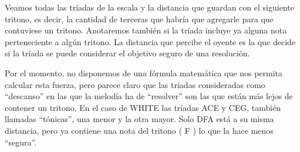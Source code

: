 \documentclass[]{report}
\begin{document}
Veamos todas las tríadas de la escala y la distancia que guardan con el siguiente tritono, es decir, la cantidad de terceras que habría que agregarle para que contuviese un tritono. Anotaremos también si la tríada incluye ya alguna nota perteneciente a algún tritono. La distancia que percibe el oyente es la que decide si la tríada se puede considerar el objetivo seguro de una resolución.

Por el momento, no disponemos de una fórmula matemática que nos permita calcular esta fuerza, pero parece claro que las tríadas consideradas como ``descanso'' en las que la melodía ha de ``resolver'' son las que están más lejos de contener un tritono. En el caso de \textsf{WHITE} las tríadas \textsf{ACE} y \textsf{CEG}, también llamadas ``tónicas'', una menor y la otra mayor. Solo \textsf{DFA} está a su misma distancia, pero ya contiene una nota del tritono ( \textsf{F} ) lo que la hace menos ``segura''.
\end{document}
